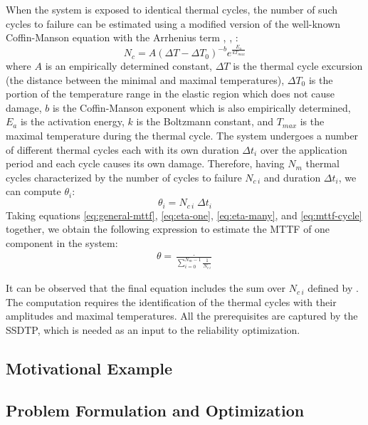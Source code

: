 When the system is exposed to identical thermal cycles, the number of such cycles to failure can be estimated using a modified version of the well-known Coffin-Manson equation with the Arrhenius term \cite{xiang2010}, \cite{jedec2010}, \cite{ciappa2003}:
\begin{equation} \label{eq:cycles-to-failure}
  N_c = A (\Delta T - \Delta T_0)^{-b} e^{\frac{E_a}{k T_{max}}}
\end{equation}
where $A$ is an empirically determined constant, $\Delta T$ is the thermal cycle excursion (the distance between the minimal and maximal temperatures), $\Delta T_0$ is the portion of the temperature range in the elastic region which does not cause damage, $b$ is the Coffin-Manson exponent which is also empirically determined, $E_{a}$ is the activation energy, $k$ is the Boltzmann constant, and $T_{max}$ is the maximal temperature during the thermal cycle. The system undergoes a number of different thermal cycles each with its own duration $\Delta t_i$ over the application period and each cycle causes its own damage. Therefore, having $N_m$ thermal cycles characterized by the number of cycles to failure $N_{c\:i}$ and duration $\Delta t_i$, we can compute $\theta_i$:
\begin{equation} \label{eq:mttf-cycle}
  \theta_i = N_{c \: i} \; \Delta t_i
\end{equation}
Taking equations \eqref{eq:general-mttf}, \eqref{eq:eta-one}, \eqref{eq:eta-many}, and \eqref{eq:mttf-cycle} together, we obtain the following expression to estimate the MTTF of one component in the system:
\begin{align} \label{eq:one-mttf}
  \theta = \frac{\period}{\sum_{i=0}^{N_m - 1} \frac{1}{N_{c \: i}}}
\end{align}

It can be observed that the final equation includes the sum over $N_{c \: i}$ defined by . The computation requires the identification of the thermal cycles with their amplitudes and maximal temperatures. All the prerequisites are captured by the SSDTP, which is needed as an input to the reliability optimization.

\subsection{Motivational Example} \label{sec:motivation}


\subsection{Problem Formulation and Optimization} \label{sec:reliability-problem}

